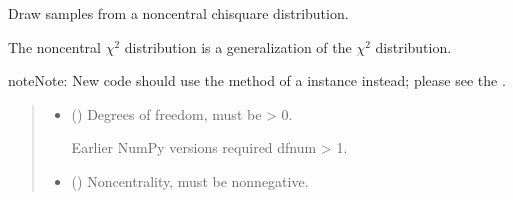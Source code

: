 \documentclass[letterpaper,10pt,english]{sphinxmanual}
\begin{document}
\begin{fulllineitems}
\label{\detokenize{metilda.controllers:metilda.controllers.pitch_art_wizard.noncentral_chisquare}}
\pysigstartsignatures
{}
\pysigstopsignatures
\sphinxAtStartPar
Draw samples from a noncentral chi\sphinxhyphen{}square distribution.

\sphinxAtStartPar
The noncentral \(\chi^2\) distribution is a generalization of
the \(\chi^2\) distribution.

\begin{sphinxadmonition}{note}{Note:}
\sphinxAtStartPar
New code should use the
method of a  instance instead;
please see the .
\end{sphinxadmonition}
\begin{quote}\begin{description}
\begin{itemize}
\item {} 
\sphinxAtStartPar
{} () \textendash{} 
\sphinxAtStartPar
Degrees of freedom, must be \textgreater{} 0.

\sphinxAtStartPar
{}Earlier NumPy versions required dfnum \textgreater{} 1.


\item {} 
\sphinxAtStartPar
{} () \textendash{} Non\sphinxhyphen{}centrality, must be non\sphinxhyphen{}negative.


\end{itemize}
\end{description}
\end{quote}
\end{fulllineitems}
\end{document}
